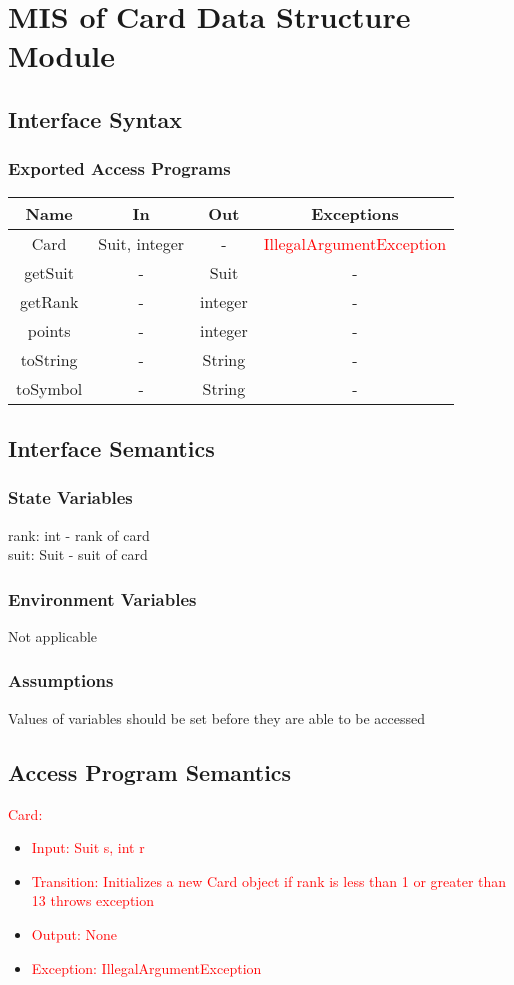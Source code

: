 \documentclass[12pt, titlepage]{article}
\begin{document}
\section{MIS of Card Data Structure Module}
\subsection{Interface Syntax}
\subsubsection{Exported Access Programs}
		\begin{tabular}[pos]{|c|c|c|c|}
			
		\hline
		\textbf{Name}& \textbf{In} & \textbf{Out} & \textbf{Exceptions} \\ \hline
		Card & Suit, integer & - & \textcolor{red}{IllegalArgumentException}\\ \hline
		getSuit & - & Suit & -\\ \hline
		getRank & - & integer & -\\ \hline
		points & - & integer & -\\ \hline
		toString & - & String & -\\ \hline
		toSymbol & - & String & -\\ \hline
		\end{tabular}

\subsection{Interface Semantics}
\subsubsection{State Variables}
rank: int - rank of card \\
suit: Suit - suit of card

\subsubsection{Environment Variables}
Not applicable

\subsubsection{Assumptions}
Values of variables should be set before they are able to be accessed

\subsection{Access Program Semantics}
\textcolor{red}{Card:}
\begin{itemize}
    \item \textcolor{red}{Input: Suit s, int r}
    \item \textcolor{red}{Transition: Initializes a new Card object if rank is less than 1 or greater than 13 throws exception}
    \item \textcolor{red}{Output: None}
    \item \textcolor{red}{Exception: IllegalArgumentException}
\end{itemize}
\end{document}
